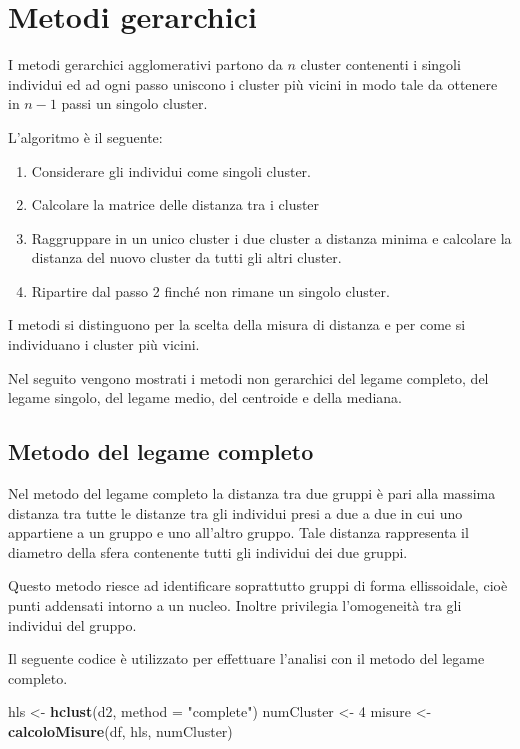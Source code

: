 \documentclass[]{book}
\newenvironment{Shaded}{\begin{snugshade}}{\end{snugshade}}
\newcommand{\KeywordTok}[1]{\textcolor[rgb]{0.13,0.29,0.53}{\textbf{#1}}}
\newcommand{\DataTypeTok}[1]{\textcolor[rgb]{0.13,0.29,0.53}{#1}}
\newcommand{\DecValTok}[1]{\textcolor[rgb]{0.00,0.00,0.81}{#1}}
\newcommand{\StringTok}[1]{\textcolor[rgb]{0.31,0.60,0.02}{#1}}
\newcommand{\NormalTok}[1]{#1}
\providecommand{\tightlist}{%
  \setlength{\itemsep}{0pt}\setlength{\parskip}{0pt}}
\begin{document}
\section{Metodi gerarchici}\label{metodi-gerarchici}

I metodi gerarchici agglomerativi partono da \(n\) cluster contenenti i
singoli individui ed ad ogni passo uniscono i cluster più vicini in modo
tale da ottenere in \(n-1\) passi un singolo cluster.

L'algoritmo è il seguente:

\begin{enumerate}
\def\labelenumi{\arabic{enumi}.}
\tightlist
\item
  Considerare gli individui come singoli cluster.
\item
  Calcolare la matrice delle distanza tra i cluster
\item
  Raggruppare in un unico cluster i due cluster a distanza minima e
  calcolare la distanza del nuovo cluster da tutti gli altri cluster.
\item
  Ripartire dal passo 2 finché non rimane un singolo cluster.
\end{enumerate}

I metodi si distinguono per la scelta della misura di distanza e per
come si individuano i cluster più vicini.

Nel seguito vengono mostrati i metodi non gerarchici del legame
completo, del legame singolo, del legame medio, del centroide e della
mediana.

\subsection{Metodo del legame
completo}\label{metodo-del-legame-completo}

Nel metodo del legame completo la distanza tra due gruppi è pari alla
massima distanza tra tutte le distanze tra gli individui presi a due a
due in cui uno appartiene a un gruppo e uno all'altro gruppo. Tale
distanza rappresenta il diametro della sfera contenente tutti gli
individui dei due gruppi.

Questo metodo riesce ad identificare soprattutto gruppi di forma
ellissoidale, cioè punti addensati intorno a un nucleo. Inoltre
privilegia l'omogeneità tra gli individui del gruppo.

Il seguente codice è utilizzato per effettuare l'analisi con il metodo
del legame completo.

\begin{Shaded}
\begin{Highlighting}[]
\NormalTok{hls <-}\StringTok{ }\KeywordTok{hclust}\NormalTok{(d2, }\DataTypeTok{method =} \StringTok{"complete"}\NormalTok{)}
\NormalTok{numCluster <-}\StringTok{ }\DecValTok{4}
\NormalTok{misure <-}\StringTok{ }\KeywordTok{calcoloMisure}\NormalTok{(df, hls, numCluster)}
\end{Highlighting}
\end{Shaded}
\end{document}
